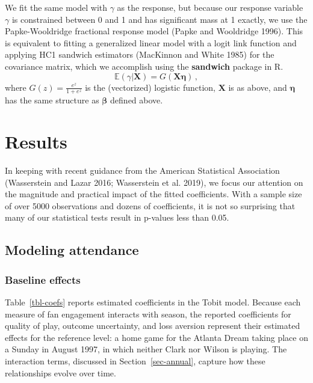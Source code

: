 \documentclass[
  letterpaper,
  DIV=11,
  numbers=noendperiod]{scrartcl}
\begin{document}
We fit the same model with \(\gamma\) as the response, but because our
response variable \(\gamma\) is constrained between 0 and 1 and has
significant mass at 1 exactly, we use the Papke-Wooldridge fractional
response model (Papke and Wooldridge 1996). This is equivalent to
fitting a generalized linear model with a logit link function and
applying HC1 sandwich estimators (MacKinnon and White 1985) for the
covariance matrix, which we accomplish using the \textbf{sandwich}
package in R. \[
  \mathbb{E}{(\gamma | \symbf{X})} = G(\symbf{X} \symbf{\eta}) \,,
\] where \(G(z) = \frac{e^z}{1 + e^z}\) is the (vectorized) logistic
function, \(\symbf{X}\) is as above, and \(\symbf{\eta}\) has the same
structure as \(\symbf{\beta}\) defined above.

\section{Results}\label{results}

In keeping with recent guidance from the American Statistical
Association (Wasserstein and Lazar 2016; Wasserstein et al. 2019), we
focus our attention on the magnitude and practical impact of the fitted
coefficients. With a sample size of over 5000 observations and dozens of
coefficients, it is not so surprising that many of our statistical tests
result in p-values less than 0.05.

\subsection{Modeling attendance}\label{sec-attend}

\subsubsection{Baseline effects}\label{baseline-effects}

Table~\ref{tbl-coefs} reports estimated coefficients in the Tobit model.
Because each measure of fan engagement interacts with season, the
reported coefficients for quality of play, outcome uncertainty, and loss
aversion represent their estimated effects for the reference level: a
home game for the Atlanta Dream taking place on a Sunday in August 1997,
in which neither Clark nor Wilson is playing. The interaction terms,
discussed in Section~\ref{sec-annual}, capture how these relationships
evolve over time.
\end{document}
